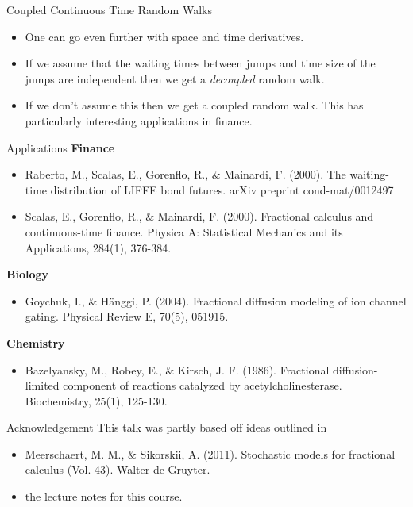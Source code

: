 \documentclass[pdf]{beamer}
\begin{document}
\begin{frame}{Coupled Continuous Time Random Walks}
    \begin{itemize}
        \item One can go even further with space and time derivatives. 
        \item If we assume that the waiting times between jumps and time size of the jumps are independent then we get a \emph{decoupled} random walk.
        \item If we don't assume this then we get a coupled random walk. This has particularly interesting applications in finance.
    \end{itemize}
\end{frame}

\begin{frame}{Applications}
    \textbf{Finance}
    \begin{itemize}
        \item Raberto, M., Scalas, E., Gorenflo, R., \& Mainardi, F. (2000). The waiting-time distribution of LIFFE bond futures. arXiv preprint cond-mat/0012497
        \item Scalas, E., Gorenflo, R., \& Mainardi, F. (2000). Fractional calculus and continuous-time finance. Physica A: Statistical Mechanics and its Applications, 284(1), 376-384.
    \end{itemize}
    \textbf{Biology}
    \begin{itemize}
        \item Goychuk, I., \& Hänggi, P. (2004). Fractional diffusion modeling of ion channel gating. Physical Review E, 70(5), 051915.
    \end{itemize}
    \textbf{Chemistry}
    \begin{itemize}
        \item Bazelyansky, M., Robey, E., \& Kirsch, J. F. (1986). Fractional diffusion-limited component of reactions catalyzed by acetylcholinesterase. Biochemistry, 25(1), 125-130.
    \end{itemize}
\end{frame}

\begin{frame}{Acknowledgement}
    This talk was partly based off ideas outlined in
    \begin{itemize}
    \item Meerschaert, M. M., \& Sikorskii, A. (2011). Stochastic models for fractional calculus (Vol. 43). Walter de Gruyter.
    \item the lecture notes for this course.
    \end{itemize}
\end{frame}
\end{document}
